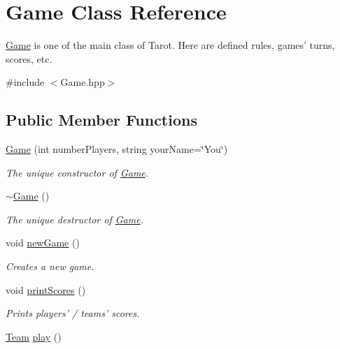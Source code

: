 \hypertarget{classGame}{\section{\-Game \-Class \-Reference}
\label{classGame}
}


\hyperlink{classGame}{\-Game} is one of the main class of \-Tarot. \-Here are defined rules, games' turns, scores, etc.  




{\ttfamily \#include $<$\-Game.\-hpp$>$}

\subsection*{\-Public \-Member \-Functions}
\begin{DoxyCompactItemize}
\item 
\hyperlink{classGame_a21476fd601061aa07e841ec8ab8f15a6}{\-Game} (int number\-Players, string your\-Name=\char`\"{}\-You\char`\"{})
\begin{DoxyCompactList}\small\item\em \-The unique constructor of \hyperlink{classGame}{\-Game}. \end{DoxyCompactList}\item 
\hypertarget{classGame_ae3d112ca6e0e55150d2fdbc704474530}{\hyperlink{classGame_ae3d112ca6e0e55150d2fdbc704474530}{$\sim$\-Game} ()}\label{classGame_ae3d112ca6e0e55150d2fdbc704474530}

\begin{DoxyCompactList}\small\item\em \-The unique destructor of \hyperlink{classGame}{\-Game}. \end{DoxyCompactList}\item 
\hypertarget{classGame_a12f32ba70a35a0dcd1f527b4d4a0d2c4}{void \hyperlink{classGame_a12f32ba70a35a0dcd1f527b4d4a0d2c4}{new\-Game} ()}\label{classGame_a12f32ba70a35a0dcd1f527b4d4a0d2c4}

\begin{DoxyCompactList}\small\item\em \-Creates a new game. \end{DoxyCompactList}\item 
\hypertarget{classGame_aa2e7e28601a14be6a92325681a7ff079}{void \hyperlink{classGame_aa2e7e28601a14be6a92325681a7ff079}{print\-Scores} ()}\label{classGame_aa2e7e28601a14be6a92325681a7ff079}

\begin{DoxyCompactList}\small\item\em \-Prints players' / teams' scores. \end{DoxyCompactList}\item 
\hypertarget{classGame_a6a76e181e24425eb361960d5b5d184bd}{\hyperlink{classTeam}{\-Team} \hyperlink{classGame_a6a76e181e24425eb361960d5b5d184bd}{play} ()}\label{classGame_a6a76e181e24425eb361960d5b5d184bd}


\end{DoxyCompactItemize}
